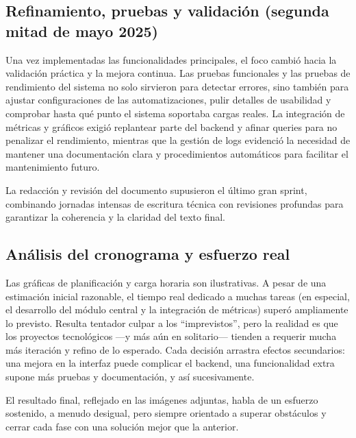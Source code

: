 \documentclass[11pt,a4paper,twoside]{report}
\begin{document}
\subsection{Refinamiento, pruebas y validación (segunda mitad de mayo 2025)}

Una vez implementadas las funcionalidades principales, el foco cambió hacia la validación práctica y la mejora continua. Las pruebas funcionales y las pruebas de rendimiento del sistema no solo sirvieron para detectar errores, sino también para ajustar configuraciones de las automatizaciones, pulir detalles de usabilidad y comprobar hasta qué punto el sistema soportaba cargas reales. La integración de métricas y gráficos exigió replantear parte del backend y afinar queries para no penalizar el rendimiento, mientras que la gestión de logs evidenció la necesidad de mantener una documentación clara y procedimientos automáticos para facilitar el mantenimiento futuro.\newline

La redacción y revisión del documento supusieron el último gran sprint, combinando jornadas intensas de escritura técnica con revisiones profundas para garantizar la coherencia y la claridad del texto final.

\subsection{Análisis del cronograma y esfuerzo real}

Las gráficas de planificación y carga horaria son ilustrativas. A pesar de una estimación inicial razonable, el tiempo real dedicado a muchas tareas (en especial, el desarrollo del módulo central y la integración de métricas) superó ampliamente lo previsto. Resulta tentador culpar a los “imprevistos”, pero la realidad es que los proyectos tecnológicos —y más aún en solitario— tienden a requerir mucha más iteración y refino de lo esperado. Cada decisión arrastra efectos secundarios: una mejora en la interfaz puede complicar el backend, una funcionalidad extra supone más pruebas y documentación, y así sucesivamente.\newline

El resultado final, reflejado en las imágenes adjuntas, habla de un esfuerzo sostenido, a menudo desigual, pero siempre orientado a superar obstáculos y cerrar cada fase con una solución mejor que la anterior.
\end{document}
